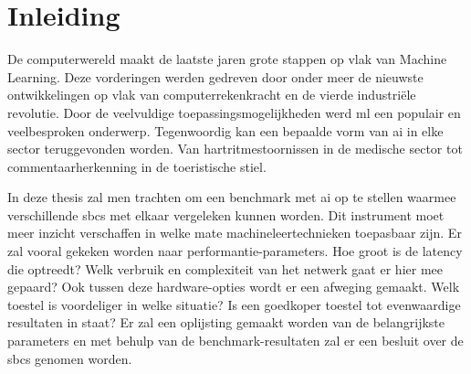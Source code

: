 \chapter{Inleiding}
De computerwereld maakt de laatste jaren grote stappen op vlak van Machine Learning\cite{Minar18}. Deze vorderingen werden gedreven door onder meer de nieuwste ontwikkelingen op vlak van computerrekenkracht en de vierde industri\"ele revolutie\cite{bloem2014fourth}. Door de veelvuldige toepassingsmogelijkheden werd \gls{ml} een populair en veelbesproken onderwerp. Tegenwoordig kan een bepaalde vorm van \gls{ai} in elke sector teruggevonden worden\cite{russell2016artificial}. Van hartritmestoornissen in de medische sector tot commentaarherkenning in de toeristische stiel. 

In deze thesis zal men trachten om een benchmark met \gls{ai} op te stellen waarmee verschillende \gls{sbc}s met elkaar vergeleken kunnen worden. Dit instrument moet meer inzicht verschaffen in welke mate machineleertechnieken toepasbaar zijn. Er zal vooral gekeken worden naar performantie-parameters. Hoe groot is de latency die optreedt? Welk verbruik en complexiteit van het netwerk gaat er hier mee gepaard? Ook tussen deze hardware-opties wordt er een afweging gemaakt. Welk toestel is voordeliger in welke situatie? Is een goedkoper toestel tot evenwaardige resultaten in staat? Er zal een oplijsting gemaakt worden van de belangrijkste parameters en met behulp van de benchmark-resultaten zal er een besluit over de \gls{sbc}s genomen worden.

